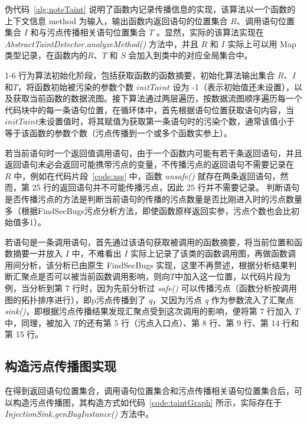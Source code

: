 伪代码~\ref{alg:noteTaint} 说明了函数内记录传播信息的实现，该算法以一个函数的上下文信息 method 为输入，输出函数内返回语句的位置集合 $R$、调用语句位置集合 $I$ 和与污点传播相关语句位置集合 $T$ 。显然，实际的该算法实现在 \textit{AbstractTaintDetector.analyzeMethod()} 方法中，并且 $R$ 和 $I$ 实际上可以用 Map 类型记录，在函数内的$R$、$T$ 和 $S$ 会加入到类中的对应全局集合中。

1-6 行为算法初始化阶段，包括获取函数的函数摘要，初始化算法输出集合 $R$、$I$和$T$，将函数初始被污染的参数个数 $initTaint$ 设为 -1（表示初始值还未设置），以及获取当前函数的数据流图。接下算法通过两层遍历，按数据流图顺序遍历每一个代码块中的每一条语句位置，在循环体中，首先根据语句位置获取语句内容，当$initTaint$未设置值时，将其赋值为获取第一条语句时的污染个数，通常该值小于等于该函数的参数个数（污点传播到一个或多个函数实参上）。

若当前语句时一个返回值调用语句，由于一个函数内可能有若干条返回语句，并且返回语句未必会返回可能携带污点的变量，不传播污点的返回语句不需要记录在 $R$ 中，例如在代码片段~\ref{code:xss} 中，函数 \textit{unsafe()} 就存在两条返回语句，然而，第 25 行的返回语句并不可能传播污点，因此 25 行并不需要记录。 判断语句是否传播污点的方法是判断当前语句的传播的污点数量是否比刚进入时的污点数量多（根据FindSecBugs污点分析方法，即使函数原样返回实参，污点个数也会比初始值多1）。

若语句是一条调用语句，首先通过该语句获取被调用的函数摘要，将当前位置和函数摘要一并放入 $I$ 中，不难看出 $I$ 实际上记录了该类的函数调用图，再做函数调用间分析，该分析已由原生 FindSecBugs 实现，这里不再赘述，根据分析结果判断汇聚点是否可以被当前函数调用影响，则向$T$中加入这一位置，以代码片段为例，当分析到第 7 行时，因为先前分析过 \textit{safe()} 可以传播污点（函数分析按调用图的拓扑排序进行），即p污点传播到了 \textit{q}，又因为污点 \textit{q} 作为参数流入了汇聚点 \textit{sink()}，即根据污点传播结果发现汇聚点受到这次调用的影响，便将第 7 行加入 $T$ 中，同理，被加入 $T$的还有第 5 行（污点入口点）、第 8 行、第 9 行、第 14 行和第 15 行。\\

\pagebreak
\subsection{构造污点传播图实现}

在得到返回语句位置集合，调用语句位置集合和污点传播相关语句位置集合后，可以构造污点传播图，其构造方式如代码~\ref{code:taintGraph} 所示，实际存在于 \textit{InjectionSink.genBugInstance()} 方法中。

